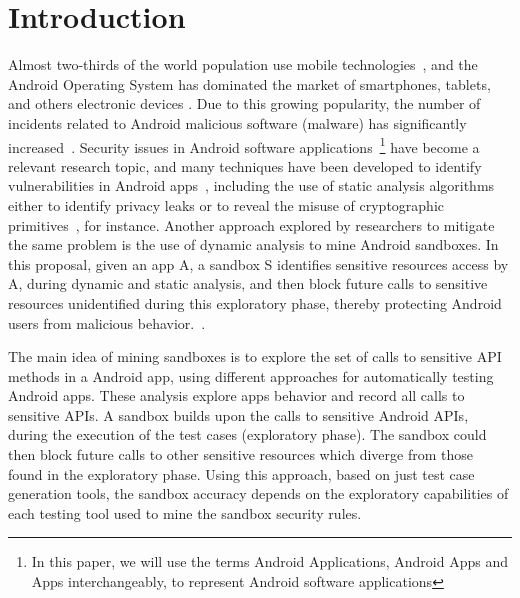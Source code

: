 \section{Introduction}\label{sec:introduction}

Almost two-thirds of the world population use mobile technologies~\cite{Comscore}, and the Android Operating System has dominated the market of smartphones, tablets, and others electronic devices \cite{statcounter}. Due to this growing popularity, the number of incidents related to Android malicious software (malware) has significantly increased~\cite{DBLP:journals/comsur/FarukiBLGGCR15,DBLP:journals/csur/SufatrioTCT15}. Security issues in Android software applications~\footnote{In this paper, we will use the terms Android Applications, Android Apps and Apps interchangeably, to represent Android software applications} have become a relevant research topic, and many techniques have been developed to identify vulnerabilities in Android apps~\cite{DBLP:conf/pldi/ArztRFBBKTOM14}, including the use of static analysis algorithms either to identify privacy leaks or to reveal the misuse of cryptographic primitives~\cite{krueger:ecoop-2018,rahaman:ccs-2019}, for instance. Another approach explored by researchers to mitigate the same problem is the use of dynamic analysis to mine Android sandboxes. In this proposal, given an app A, a sandbox S identifies sensitive resources access by A, during dynamic and static analysis, and then block future calls to sensitive resources unidentified during this exploratory phase, thereby protecting Android users from malicious behavior.~\cite{DBLP:conf/icse/JamrozikSZ16}.

The main idea of mining sandboxes is to explore the set of calls to sensitive API methods in a Android app, using different approaches for automatically testing Android apps. These analysis explore apps behavior and record all calls to sensitive APIs. A sandbox builds upon the calls to sensitive Android APIs, during the execution of the test cases (exploratory phase). The sandbox could then block future calls to other sensitive resources which diverge from those found in the exploratory phase. Using this approach, based on just test case generation tools, the sandbox accuracy depends on the exploratory capabilities of each testing tool used to mine the sandbox security rules.
  
